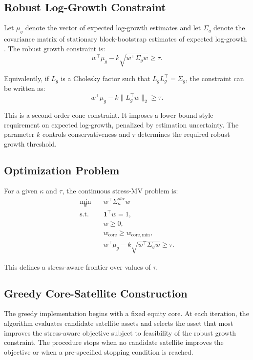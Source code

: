 \documentclass[11pt]{article}
\begin{document}
\subsection{Robust Log-Growth Constraint}

Let $\mu_g$ denote the vector of expected log-growth estimates and let $\Sigma_g$ denote the covariance matrix of stationary block-bootstrap estimates of expected log-growth \citep{politisromano1994}. The robust growth constraint is:
\begin{equation}
w^\top \mu_g - k \sqrt{w^\top \Sigma_g w} \geq \tau.
\end{equation}

Equivalently, if $L_g$ is a Cholesky factor such that $L_g L_g^\top = \Sigma_g$, the constraint can be written as:
\begin{equation}
w^\top \mu_g - k \|L_g^\top w\|_2 \geq \tau.
\end{equation}

This is a second-order cone constraint. It imposes a lower-bound-style requirement on expected log-growth, penalized by estimation uncertainty. The parameter $k$ controls conservativeness and $\tau$ determines the required robust growth threshold.

\subsection{Optimization Problem}

For a given $\kappa$ and $\tau$, the continuous stress-MV problem is:
\begin{align}
\min_w \quad & w^\top \Sigma_{\kappa}^{shr} w \\
\text{s.t.} \quad & \mathbf{1}^\top w = 1, \\
& w \geq 0, \\
& w_{\mathrm{core}} \geq w_{\mathrm{core,min}}, \\
& w^\top \mu_g - k \sqrt{w^\top \Sigma_g w} \geq \tau.
\end{align}

This defines a stress-aware frontier over values of $\tau$.

\subsection{Greedy Core-Satellite Construction}

The greedy implementation begins with a fixed equity core. At each iteration, the algorithm evaluates candidate satellite assets and selects the asset that most improves the stress-aware objective subject to feasibility of the robust growth constraint. The procedure stops when no candidate satellite improves the objective or when a pre-specified stopping condition is reached.
\end{document}
